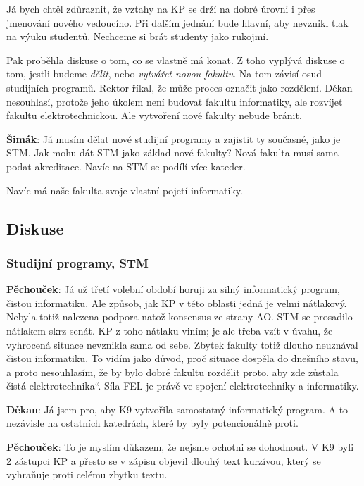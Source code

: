 \documentclass[a4paper,10pt,notitlepage]{article}
\newcommand{\cl}[1]{\noindent \textbf{#1}:}
\newcommand\uv[1]{\quotedblbase #1\textquotedblleft}%
\begin{document}
Já bych chtěl zdůraznit, že vztahy na KP se drží na dobré úrovni i přes jmenování nového vedoucího. Při dalším jednání bude hlavní, aby nevznikl tlak na výuku studentů. Nechceme si brát studenty jako rukojmí.

Pak proběhla diskuse o tom, co se vlastně má konat. Z toho vyplývá diskuse o tom, jestli budeme \textit{dělit}, nebo \textit{vytvářet novou fakultu}. Na tom závisí osud studijních programů. Rektor říkal, že může proces označit jako rozdělení. Děkan nesouhlasí, protože jeho úkolem není budovat fakultu informatiky, ale rozvíjet fakultu elektrotechnickou. Ale vytvoření nové fakulty nebude bránit.

\medskip

\cl{Šimák} Já musím dělat nové studijní programy a zajistit ty současné, jako je STM. Jak mohu dát STM jako základ nové fakulty? Nová fakulta musí sama podat akreditace. Navíc na STM se podílí více kateder.

Navíc má naše fakulta svoje vlastní pojetí informatiky.

\subsection{Diskuse}

\subsubsection{Studijní programy, STM}

\cl{Pěchouček} Já už třetí volební období horuji za silný informatický program, čistou informatiku. Ale způsob, jak KP v této oblasti jedná je velmi nátlakový. Nebyla totiž nalezena podpora natož konsensus ze strany AO. STM se prosadilo nátlakem skrz senát. KP z toho nátlaku viním; je ale třeba vzít v úvahu, že vyhrocená situace nevznikla sama od sebe.  Zbytek fakulty totiž dlouho neuznával čistou informatiku. To vidím jako důvod, proč situace dospěla do dnešního stavu, a proto nesouhlasím, že by bylo dobré fakultu rozdělit proto, aby zde zůstala \uv{čistá elektrotechnika}. Síla FEL je právě ve spojení elektrotechniky a informatiky.
  
\cl{Děkan} Já jsem pro, aby K9 vytvořila samostatný informatický program. A to nezávisle na ostatních katedrách, které by byly potencionálně proti.

\cl{Pěchouček} To je myslím důkazem, že nejsme ochotni se dohodnout. V K9 byli 2 zástupci KP a přesto se v zápisu objevil dlouhý text kurzívou, který se vyhraňuje proti celému zbytku textu.
\end{document}
